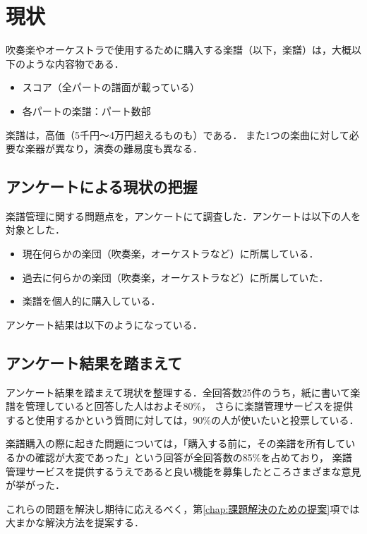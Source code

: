 \chapter{現状}
吹奏楽やオーケストラで使用するために購入する楽譜（以下，楽譜）は，大概以下のような内容物である．
\begin{itemize}
	\item スコア（全パートの譜面が載っている）
	\item 各パートの楽譜：パート数部
\end{itemize}
楽譜は，高価（5千円〜4万円超えるものも）である．
また1つの楽曲に対して必要な楽器が異なり，演奏の難易度も異なる．
\section{アンケートによる現状の把握}
楽譜管理に関する問題点を，アンケートにて調査した．アンケートは以下の人を対象とした．
\begin{itemize}
	\item 現在何らかの楽団（吹奏楽，オーケストラなど）に所属している．
	\item 過去に何らかの楽団（吹奏楽，オーケストラなど）に所属していた．
	\item 楽譜を個人的に購入している．
\end{itemize}
アンケート結果は以下のようになっている．

\section{アンケート結果を踏まえて}\label{chap:issues}
アンケート結果を踏まえて現状を整理する．全回答数25件のうち，紙に書いて楽譜を管理していると回答した人はおよそ80\%，
さらに楽譜管理サービスを提供すると使用するかという質問に対しては，90\%の人が使いたいと投票している．\par
楽譜購入の際に起きた問題については，「購入する前に，その楽譜を所有しているかの確認が{{大変}}であった」という回答が全回答数の85\%を占めており，
楽譜管理サービスを提供するうえであると良い機能を募集したところさまざまな意見が挙がった．\par
これらの問題を解決し期待に応えるべく，第\ref{chap:課題解決のための提案}項では大まかな解決方法を提案する．